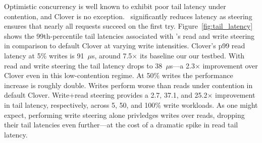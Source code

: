 Optimistic concurrency is well known to exhibit poor tail latency
under contention, and Clover is no exception.  \sword\ significantly
reduces latency as steering ensures that nearly all requests succeed
on the first try.
%
Figure~\ref{fig:tail_latency} shows the 99th-percentile tail latencies
associated with \sword's read and write steering in comparison to
default Clover at varying write intensities. Clover's p99 read latency
at 5\% writes is 91~$\mu$s, around 7.5$\times$ its
baseline our our testbed. With read and write steering the tail
latency drops to 38~$\mu$s---a 2.3$\times$ improvement over
Clover even in this low-contention regime. At 50\% writes the
performance increase is roughly double.
%
%
Writes perform
worse than reads under contention in default Clover. Write+read
steering provides a 2.7, 37.1, and 25.2$\times$
improvement in tail latency, respectively, across 5, 50, and 100\%
write workloads.  As one might expect, performing write steering alone
privledges writes over reads, dropping their tail latencies even
further---at the cost of a dramatic
spike in read tail latency.






